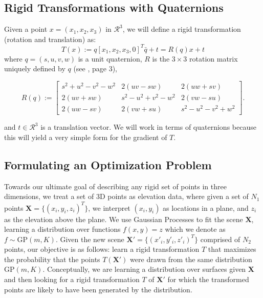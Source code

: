 \documentclass{article} %
\begin{document}
\subsection{Rigid Transformations with Quaternions}
Given a point $x = (x_1,x_2,x_3)$ in $\mathcal{R}^3$, we will define a rigid transformation (rotation and translation) as:
$$T(x) := q [x_1, x_2, x_3, 0]^T \bar q +t = R(q) x + t$$ where $q = (s,u,v,w)$ is a unit quaternion, $R$ is the $3 \times 3$ rotation matrix uniquely defined by $q$ (see \cite{wheeler1995}, page 3),

\begin{equation}
R(q) := \left[ \begin{array}{ccc}
s^2+u^2-v^2-w^2 & 2(uv-sw) & 2(uw+sv)\\
2(uv+sw) & s^2-u^2+v^2-w^2 & 2(vw-su)\\
2(uw-sv) & 2(vw+su) & s^2-u^2-v^2+w^2\end{array} \right].
\end{equation} 

and $t \in \mathcal{R}^3$ is a translation vector. We will work in terms of quaternions because this will yield a very simple form for the gradient of $T$. 


%
%

\subsection{Formulating an Optimization Problem}
Towards our ultimate goal of describing any rigid set of points in three dimensions, we treat a set of 3D points as elevation data, where given a set of $N_1$ points $\mathbf{X} = \{(x_i,y_i,z_i)^{T}\}$, we interpret $(x_i,y_i)$ as locations in a plane, and $z_i$ as the elevation above the plane. We use Gaussian Processes to fit the scene $\mathbf{X}$, learning a distribution over functions $f(x,y) = z$ which we denote as $f \sim \mbox{GP}(m,K)$. Given the new scene $\mathbf{X'} = \{(x'_i,y'_i,z'_i)^{T}\}$ comprised of $N_2$ points, our objective is as follows: learn a rigid transformation $T$ that maximizes the probability that the points $T(\mathbf{X'})$ were drawn from the same distribution $\mbox{GP}(m,K)$. Conceptually, we are learning a distribution over surfaces given $\mathbf{X}$ and then looking for a rigid transformation $T$ of $\mathbf{X'}$ for which the transformed points are likely to have been generated by the distribution.
\end{document}
